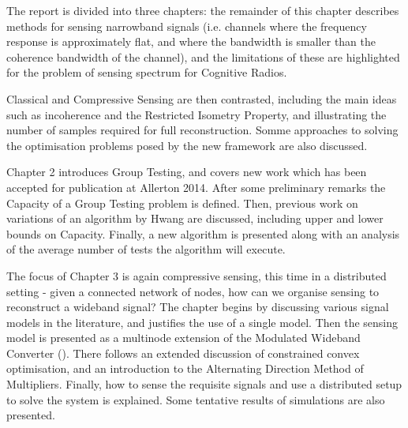 The report is divided into three chapters: the remainder of this chapter describes methods for sensing narrowband signals (i.e. channels where the frequency response is approximately flat, and where the bandwidth is smaller than the coherence bandwidth of the channel), and the limitations of these are highlighted for the problem of sensing spectrum for Cognitive Radios. 

Classical and Compressive Sensing are then contrasted, including the main ideas such as incoherence and the Restricted Isometry Property, and illustrating the number of samples required for full reconstruction.   Somme approaches to solving the optimisation problems posed by the new framework are also discussed.

Chapter 2 introduces Group Testing, and covers new work which has been accepted for publication at Allerton 2014. After some preliminary remarks the Capacity of a Group Testing problem is defined. Then, previous work on variations of an algorithm by Hwang are discussed, including upper and lower bounds on Capacity. Finally, a new algorithm is presented along with an analysis of the average number of tests the algorithm will execute.

The focus of Chapter 3 is again compressive sensing, this time in a distributed setting - given a connected network of nodes, how can we organise sensing to reconstruct a wideband signal? The chapter begins by discussing various signal models in the literature, and justifies the use of a single model. Then the sensing model is presented as a multinode extension of the Modulated Wideband Converter (\cite{mishali2010theory}). There follows an extended discussion of constrained convex optimisation, and an introduction to the Alternating Direction Method of Multipliers. Finally, how to sense the requisite signals and use a distributed setup to solve the system is explained. Some tentative results of simulations are also presented.